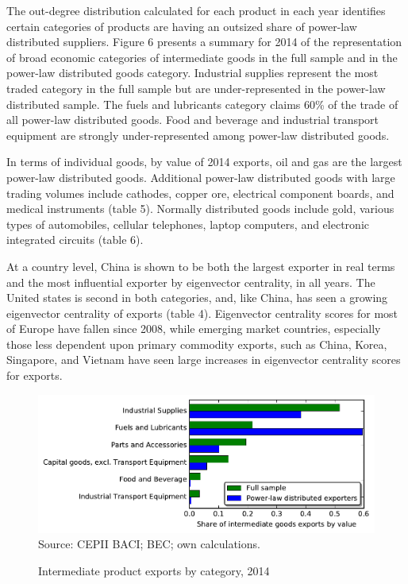 \documentclass[10pt,letterpaper]{article}
\begin{document}
The out-degree distribution calculated for each product in each year identifies certain categories of products are having an outsized share of power-law distributed suppliers. Figure 6 presents a summary for 2014 of the representation of broad economic categories of intermediate goods in the full sample and in the power-law distributed goods category. Industrial supplies represent the most traded category in the full sample but are under-represented in the power-law distributed sample. The fuels and lubricants category claims 60\% of the trade of all power-law distributed goods. Food and beverage and industrial transport equipment are strongly under-represented among power-law distributed goods. 

In terms of individual goods, by value of 2014 exports, oil and gas are the largest power-law distributed goods. Additional power-law distributed goods with large trading volumes include cathodes, copper ore, electrical component boards, and medical instruments (table 5). Normally distributed goods include gold, various types of automobiles, cellular telephones, laptop computers, and electronic integrated circuits (table 6). 

At a country level, China is shown to be both the largest exporter in real terms and the most influential exporter by eigenvector centrality, in all years. The United states is second in both categories, and, like China, has seen a growing eigenvector centrality of exports (table 4). Eigenvector centrality scores for most of Europe have fallen since 2008, while emerging market countries, especially those less dependent upon primary commodity exports, such as China, Korea, Singapore, and Vietnam have seen large increases in eigenvector centrality scores for exports. 

\begin{figure}
  \caption{Intermediate product exports by category, 2014}
  \centering
\includegraphics[scale=0.7]{plots/bec_cat.pdf} \\
\footnotesize{Source: CEPII BACI; BEC; own calculations.}\\
\end{figure}
\end{document}
